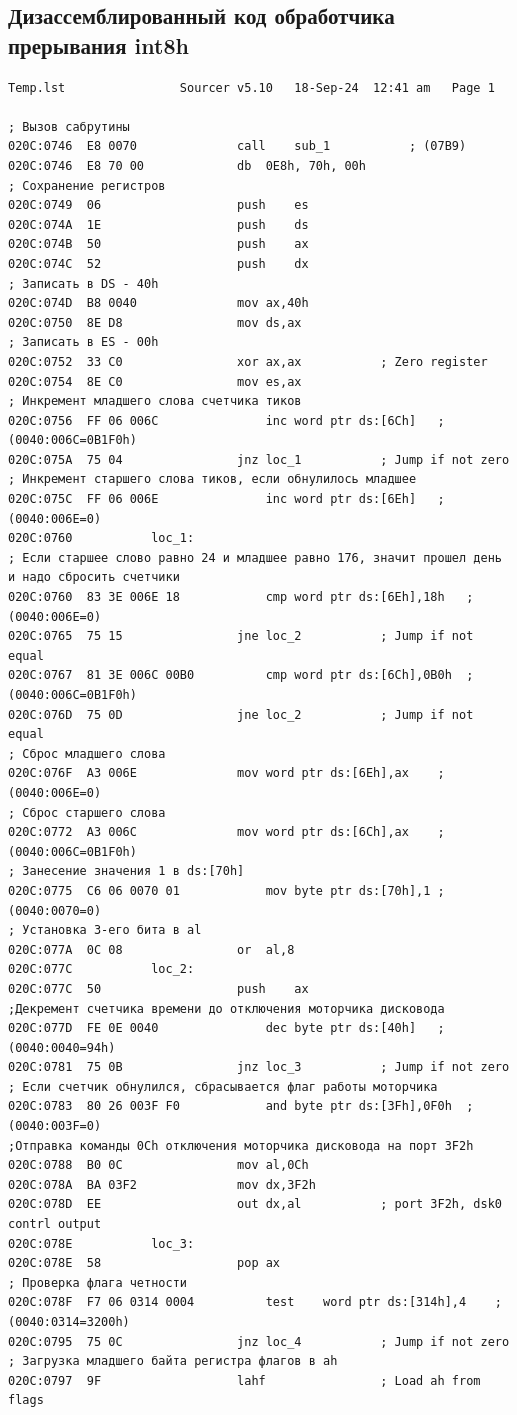 \documentclass{article}
\begin{document}
\subsection{Дизассемблированный код обработчика прерывания int8h}
\begin{lstlisting}[style={asm}]
            Temp.lst				Sourcer	v5.10   18-Sep-24  12:41 am   Page 1

; Вызов сабрутины
020C:0746  E8 0070				call	sub_1			; (07B9)
020C:0746  E8 70 00				db	0E8h, 70h, 00h
; Сохранение регистров
020C:0749  06					push	es
020C:074A  1E					push	ds
020C:074B  50					push	ax
020C:074C  52					push	dx
; Записать в DS - 40h 
020C:074D  B8 0040				mov	ax,40h
020C:0750  8E D8				mov	ds,ax
; Записать в ES - 00h
020C:0752  33 C0				xor	ax,ax			; Zero register
020C:0754  8E C0				mov	es,ax
; Инкремент младшего слова счетчика тиков
020C:0756  FF 06 006C				inc	word ptr ds:[6Ch]	; (0040:006C=0B1F0h)
020C:075A  75 04				jnz	loc_1			; Jump if not zero
; Инкремент старшего слова тиков, если обнулилось младшее
020C:075C  FF 06 006E				inc	word ptr ds:[6Eh]	; (0040:006E=0)
020C:0760			loc_1:
; Если старшее слово равно 24 и младшее равно 176, значит прошел день и надо сбросить счетчики
020C:0760  83 3E 006E 18			cmp	word ptr ds:[6Eh],18h	; (0040:006E=0)
020C:0765  75 15				jne	loc_2			; Jump if not equal
020C:0767  81 3E 006C 00B0			cmp	word ptr ds:[6Ch],0B0h	; (0040:006C=0B1F0h)
020C:076D  75 0D				jne	loc_2			; Jump if not equal
; Сброс младшего слова
020C:076F  A3 006E				mov	word ptr ds:[6Eh],ax	; (0040:006E=0)
; Сброс старшего слова
020C:0772  A3 006C				mov	word ptr ds:[6Ch],ax	; (0040:006C=0B1F0h)
; Занесение значения 1 в ds:[70h]
020C:0775  C6 06 0070 01			mov	byte ptr ds:[70h],1	; (0040:0070=0)
; Установка 3-его бита в al
020C:077A  0C 08				or	al,8
020C:077C			loc_2:
020C:077C  50					push	ax
;Декремент счетчика времени до отключения моторчика дисковода
020C:077D  FE 0E 0040				dec	byte ptr ds:[40h]	; (0040:0040=94h)
020C:0781  75 0B				jnz	loc_3			; Jump if not zero
; Если счетчик обнулился, сбрасывается флаг работы моторчика
020C:0783  80 26 003F F0			and	byte ptr ds:[3Fh],0F0h	; (0040:003F=0)
;Отправка команды 0Ch отключения моторчика дисковода на порт 3F2h
020C:0788  B0 0C				mov	al,0Ch
020C:078A  BA 03F2				mov	dx,3F2h
020C:078D  EE					out	dx,al			; port 3F2h, dsk0 contrl output
020C:078E			loc_3:
020C:078E  58					pop	ax
; Проверка флага четности
020C:078F  F7 06 0314 0004			test	word ptr ds:[314h],4	; (0040:0314=3200h)
020C:0795  75 0C				jnz	loc_4			; Jump if not zero
; Загрузка младшего байта регистра флагов в ah
020C:0797  9F					lahf				; Load ah from flags

\end{lstlisting}
\end{document}
